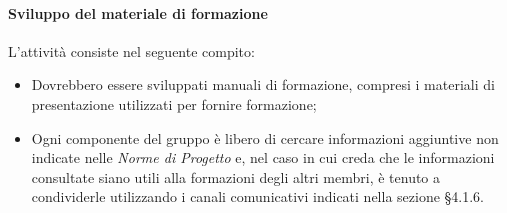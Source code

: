 		\paragraph{Sviluppo del materiale di formazione}
		L'attività consiste nel seguente compito:
		\begin{itemize}
			\item Dovrebbero essere sviluppati manuali di formazione, compresi i materiali di presentazione utilizzati per fornire formazione;
			\item Ogni componente del gruppo è libero di cercare informazioni aggiuntive non indicate nelle \textit{Norme di Progetto} e, nel caso in cui creda che le informazioni consultate siano utili  alla formazioni degli altri membri, è tenuto a condividerle utilizzando i canali comunicativi indicati nella sezione §4.1.6.
		\end{itemize}
		
		
		
